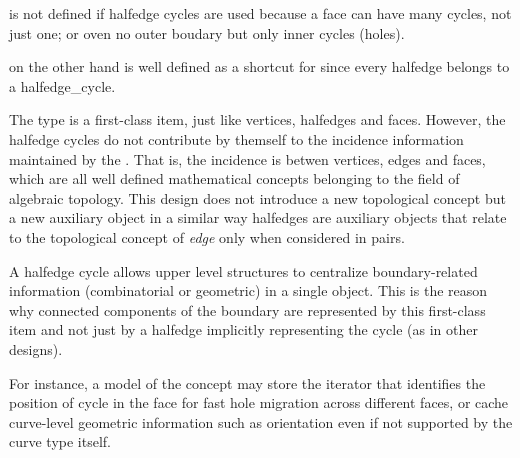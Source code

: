 { is not defined if halfedge cycles  are used because a face
can have many cycles, not just one; or oven no outer boudary but only inner cycles (holes).

 on the other hand is well defined as a shortcut for 
since every halfedge belongs to a halfedge\_cycle.

The type  is a first-class  item, just like vertices, halfedges and faces.
However, the halfedge cycles do not contribute  by themself to the incidence information 
maintained by the . That is, the incidence is betwen vertices, edges and faces,
which are all well defined mathematical concepts belonging to the field of algebraic topology.
This design does not introduce a new topological concept but a new
auxiliary object in a similar way halfedges are auxiliary objects that 
relate to the topological concept of {\em edge} only when considered in pairs.

A halfedge cycle allows upper level structures to centralize boundary-related information
(combinatorial or geometric) in a single object. This is the reason why 
connected components of the boundary are represented by this first-class  item 
and not just by a halfedge implicitly representing the cycle (as in other designs).

For instance, a model of the  concept  may store the iterator that identifies the position of
cycle in the face for fast hole migration across different faces, or cache curve-level geometric
information such as orientation even if not supported by the curve type itself.
}

